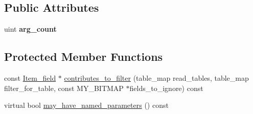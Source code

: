 \subsection*{Public Attributes}
\begin{DoxyCompactItemize}
\item 
\mbox{\label{classItem__func_aac53770282ab70f562f68e1443e4d8da}} 
uint {\bfseries arg\+\_\+count}
\end{DoxyCompactItemize}
\subsection*{Protected Member Functions}
\begin{DoxyCompactItemize}
\item 
const \mbox{\hyperlink{classItem__field}{Item\+\_\+field}} $\ast$ \mbox{\hyperlink{classItem__func_ab1f796aa3d44e61c2191a33f98b6b78f}{contributes\+\_\+to\+\_\+filter}} (table\+\_\+map read\+\_\+tables, table\+\_\+map filter\+\_\+for\+\_\+table, const M\+Y\+\_\+\+B\+I\+T\+M\+AP $\ast$fields\+\_\+to\+\_\+ignore) const
\item 
virtual bool \mbox{\hyperlink{classItem__func_a8327a37c4f343c168f7ce76efa23a243}{may\+\_\+have\+\_\+named\+\_\+parameters}} () const
\end{DoxyCompactItemize}

